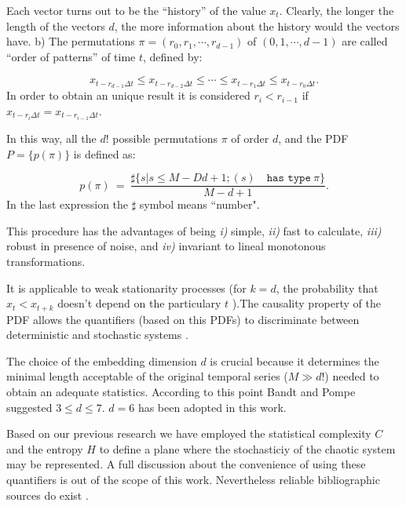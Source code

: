 Each vector turns out to be the ``history'' of the value $x_t$.
Clearly, the longer the length of the vectors $d$, the more
information about the history would the vectors have. b) The
permutations $\pi=(r_0, r_1, \cdots, r_{d-1})$ of $(0, 1, \cdots,
d-1)$ are called ``order of patterns'' of time $t$, defined by:

\begin{equation}
\label{eq:permuta}
x_{t-r_{d-1}\Delta t}\le x_{t-r_{d-2}\Delta t}\le\cdots\le x_{t-r_{1}\Delta t}\le x_{t-r_0\Delta t}.
\end{equation}
%
In order to obtain an unique result it is considered $r_i
<r_{i-1}$ if $x_{t-r_{i}\Delta t}=x_{t-r_{i-1}\Delta t}$.

In this way, all the $d!$ possible permutations $\pi$ of order
$d$, and the PDF $P=\{p(\pi)\}$ is defined as:

\begin{equation}
\label{eq:frequ}
p(\pi)~=~ \frac{\sharp \{s|s\leq M-Dd+1; (s) \quad \texttt{has type}~\pi\}}{M-d+1}.
\end{equation}
In the last expression the $\sharp$ symbol means ``number".

This procedure has the advantages of being {\it i)\/} simple, {\it
ii)\/} fast to calculate, {\it iii)\/} robust in presence of
noise, and {\it iv)\/} invariant to lineal monotonous
transformations.

It is applicable to weak stationarity processes (for
$k=d$, the probability that $x_t < x_{t+k}$ doesn't depend on the
particulary $t$ \cite{Pompe2002}).The causality property of the
PDF allows the quantifiers (based on this PDFs) to discriminate
between deterministic and stochastic systems \cite{Rosso2007B}.

The choice of the embedding dimension $d$ is crucial because it
determines the minimal length acceptable of the original temporal
series ($M \gg d!$) needed to obtain an adequate statistics.
According to this point Bandt and Pompe suggested $3\leq d \leq
7$. $d=6$ has been adopted in this work.

Based on our previous research \cite{DeMicco2009} we have employed
the statistical complexity $C$ and the entropy $H$ to define a plane where the stochasticiy of the chaotic system may be represented. A full discussion about the convenience of using these quantifiers is
out of the scope of this work. Nevertheless reliable bibliographic
sources do exist
\cite{Wackerbauer1994,Lopez1995,Rosso2007A,DeMicco2008,Rosso2009,Martin2006}.


